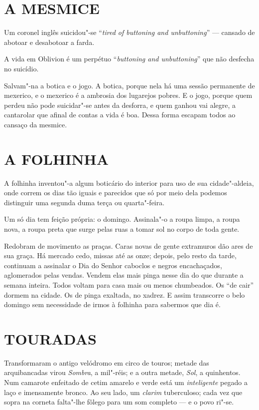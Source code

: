 \section*{A MESMICE}

Um coronel inglês suicidou"-se ``\emph{tired of buttoning and
unbuttoning}'' --- cansado de abotoar e desabotoar a farda.

A vida em Oblivion é um perpétuo ``\emph{buttoning and unbuttoning}''
que não desfecha no suicídio.

Salvam"-na a botica e o jogo. A botica, porque nela há uma sessão
permanente de mexerico, e o mexerico é a ambrosia dos lugarejos pobres.
E o jogo, porque quem perdeu não pode suicidar"-se antes da desforra, e
quem ganhou vai alegre, a cantarolar que afinal de contas a vida é boa.
Dessa forma escapam todos ao cansaço da mesmice.

\section*{A FOLHINHA}

A folhinha inventou"-a algum boticário do interior para uso de sua
cidade"-aldeia, onde correm os dias tão iguais e parecidos que só por
meio dela podemos distinguir uma segunda duma terça ou quarta"-feira.

Um só dia tem feição própria: o domingo. Assinala"-o a roupa limpa, a
roupa nova, a roupa preta que surge pelas ruas a tomar sol no corpo de
toda gente.

Redobram de movimento as praças. Caras novas de gente extramuros dão
ares de sua graça. Há mercado cedo, missas até as onze; depois, pelo
resto da tarde, continuam a assinalar o Dia do Senhor caboclos e negros
encachaçados, aglomerados pelas vendas. Vendem elas mais pinga nesse dia
do que durante a semana inteira. Todos voltam para casa mais ou menos
chumbeados. Os ``de cair'' dormem na cidade. Os de pinga exaltada, no
xadrez. E assim transcorre o belo domingo sem necessidade de irmos à
folhinha para sabermos que dia é.

\section*{TOURADAS}

Transformaram o antigo velódromo em circo de touros; metade das
arquibancadas virou \emph{Sombra}, a mil"-réis; e a outra metade,
\emph{Sol}, a quinhentos. Num camarote enfeitado de cetim amarelo e
verde está um \emph{inteligente} pegado a laço e imensamente bronco. Ao
seu lado, um \emph{clarim} tuberculoso; cada vez que sopra na corneta
falta"-lhe fôlego para um som completo --- e o povo ri"-se.

